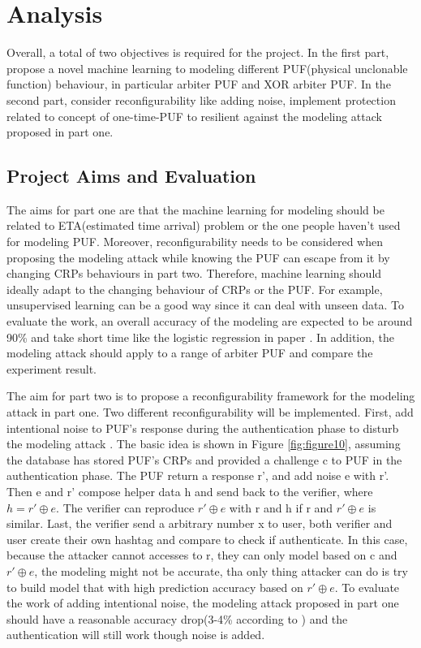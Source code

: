 \chapter{Analysis}
Overall, a total of two objectives is required for the project. In the first part, propose a novel machine learning to modeling different PUF(physical unclonable function)
behaviour, in particular arbiter PUF and XOR arbiter PUF. In the second part, consider reconfigurability like adding noise, implement protection related to concept of one-time-PUF to resilient against the modeling attack
proposed in part one.

\section{Project Aims and Evaluation}
The aims for part one are that the machine learning for modeling should be related to ETA(estimated time arrival) problem or the one people haven't used for modeling
PUF. Moreover, reconfigurability needs to be considered when proposing the modeling attack while knowing the PUF can escape from it by changing CRPs behaviours in part 
two. Therefore, machine learning should ideally adapt to the changing behaviour of CRPs or the PUF. For example, unsupervised learning can be a good way since it can 
deal with unseen data. To evaluate the work, an overall accuracy of the modeling are expected to be around 90\% and take short time like the logistic regression in 
paper \cite{Reference6}. In addition, the modeling attack should apply to a range of arbiter PUF and compare the experiment result.

The aim for part two is to propose a reconfigurability framework for the modeling attack in part one. Two different reconfigurability will be implemented. First, add intentional
noise to PUF's response during the authentication phase to disturb the modeling attack \cite{Reference8}. The basic idea is shown in Figure \ref{fig:figure10}, assuming the database has stored PUF's CRPs and provided a challenge c
to PUF in the authentication phase. The PUF return a response r', and add noise e with r'. Then e and r' compose helper data h and send back to the verifier, where $h = r'\oplus e$. The verifier can reproduce $r'\oplus e$  
with r and h if r and $r'\oplus e$ is similar. Last, the verifier send a arbitrary number x to user, both verifier and user create their own hashtag and compare to check if authenticate. In this case, because the attacker cannot accesses to r, they can only model based on c and $r'\oplus e$, the modeling
might not be accurate, tha only thing attacker can do is try to build model that with high prediction accuracy based on $r'\oplus e$. To evaluate the work of adding intentional noise, the modeling attack proposed in part one should have a reasonable accuracy drop(3-4\% according to \cite{Reference8}) and the authentication will still work 
though noise is added.

